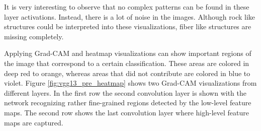 \begin{figure}[!h]
\label{fig:vgg13_fromscratch_filters}
\end{figure}

\quad

It is very interesting to observe that no complex patterns can be found in these layer activations. Instead, there is a lot of noise in the images. Although rock like structures could be interpreted into these visualizations, fiber like structures are missing completely.

Applying Grad-CAM and heatmap visualizations can show important regions of the image that correspond to a certain classification. These areas are colored in deep red to orange, whereas areas that did not contribute are colored in blue to violet. Figure \ref{fig:vgg13_pre_heatmap} shows two Grad-CAM visualizations from different layers. In the first row the second convolution layer is shown with the network recognizing rather fine-grained regions detected by the low-level feature maps. The second row shows the last convolution layer where high-level feature maps are captured. \\


